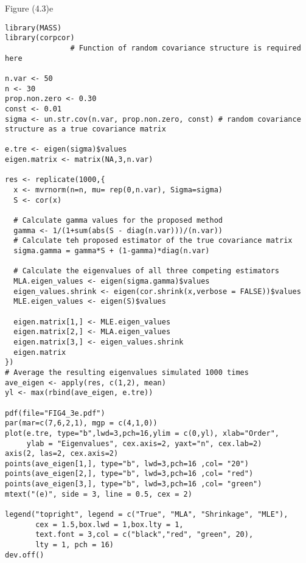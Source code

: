 Figure (4.3)e
\begin{lstlisting}
library(MASS)
library(corpcor)
               # Function of random covariance structure is required here

n.var <- 50
n <- 30
prop.non.zero <- 0.30
const <- 0.01
sigma <- un.str.cov(n.var, prop.non.zero, const) # random covariance structure as a true covariance matrix

e.tre <- eigen(sigma)$values
eigen.matrix <- matrix(NA,3,n.var)

res <- replicate(1000,{
  x <- mvrnorm(n=n, mu= rep(0,n.var), Sigma=sigma)
  S <- cor(x)
  
  # Calculate gamma values for the proposed method
  gamma <- 1/(1+sum(abs(S - diag(n.var)))/(n.var))
  # Calculate teh proposed estimator of the true covariance matrix
  sigma.gamma = gamma*S + (1-gamma)*diag(n.var)
  
  # Calculate the eigenvalues of all three competing estimators
  MLA.eigen_values <- eigen(sigma.gamma)$values
  eigen_values.shrink <- eigen(cor.shrink(x,verbose = FALSE))$values
  MLE.eigen_values <- eigen(S)$values
  
  eigen.matrix[1,] <- MLE.eigen_values
  eigen.matrix[2,] <- MLA.eigen_values
  eigen.matrix[3,] <- eigen_values.shrink
  eigen.matrix
})
# Average the resulting eigenvalues simulated 1000 times
ave_eigen <- apply(res, c(1,2), mean)
yl <- max(rbind(ave_eigen, e.tre))

pdf(file="FIG4_3e.pdf")
par(mar=c(7,6,2,1), mgp = c(4,1,0))
plot(e.tre, type="b",lwd=3,pch=16,ylim = c(0,yl), xlab="Order",
     ylab = "Eigenvalues", cex.axis=2, yaxt="n", cex.lab=2)
axis(2, las=2, cex.axis=2)
points(ave_eigen[1,], type="b", lwd=3,pch=16 ,col= "20")
points(ave_eigen[2,], type="b", lwd=3,pch=16 ,col= "red")
points(ave_eigen[3,], type="b", lwd=3,pch=16 ,col= "green")
mtext("(e)", side = 3, line = 0.5, cex = 2)

legend("topright", legend = c("True", "MLA", "Shrinkage", "MLE"),
       cex = 1.5,box.lwd = 1,box.lty = 1,
       text.font = 3,col = c("black","red", "green", 20),
       lty = 1, pch = 16)
dev.off()
\end{lstlisting}